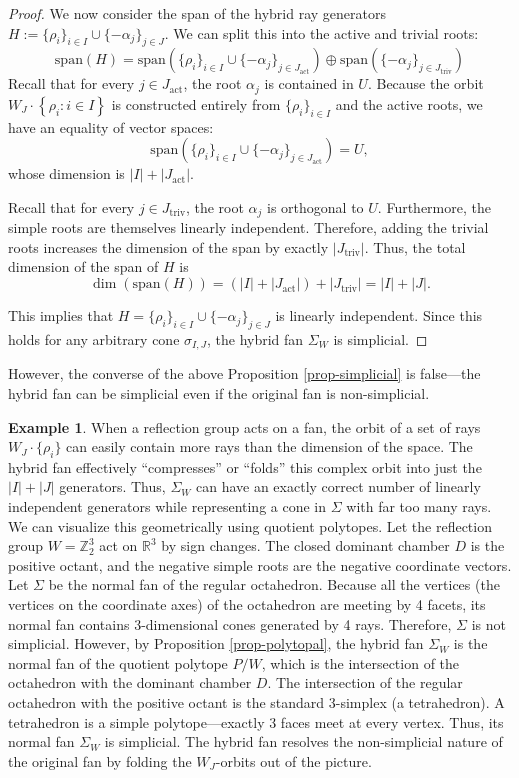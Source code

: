 \documentclass{amsart}
\theoremstyle{definition}
\newtheorem{example}[theorem]{Example}
\theoremstyle{remark}
\numberwithin{equation}{section}
\begin{document}
\begin{proof}
We now consider the span of the hybrid ray generators $H:=\{\rho_i\}_{i\in I} \cup \{-\alpha_j\}_{j \in J}$. 
We can split this into the active and trivial roots:
$$\text{span}(H) = \text{span} \left( \{\rho_i\}_{i\in I} \cup \{-\alpha_j\}_{j \in J_{\text{act}}} \right) \oplus \text{span} \left( \{-\alpha_j\}_{j \in J_{\text{triv}}} \right)$$
Recall that for every $j \in J_{\text{act}}$, the root $\alpha_j$ is contained in $U$. Because the orbit $W_J \cdot \left\{\rho_i: i \in I\right\}$ is constructed entirely from $\{\rho_i\}_{i\in I}$ and the active roots, we have an equality of vector spaces:
$$\text{span} \left( \{\rho_i\}_{i\in I} \cup \{-\alpha_j\}_{j \in J_{\text{act}}} \right) = U,$$
whose dimension is $|I| + |J_{\text{act}}|$.

Recall that for every $j \in J_{\text{triv}}$, the root $\alpha_j$ is orthogonal to $U$. Furthermore, the simple roots are themselves linearly independent. Therefore, adding the trivial roots increases the dimension of the span by exactly $|J_{\text{triv}}|$. Thus, the total dimension of the span of $H$ is
$$\dim(\text{span}(H)) = (|I| + |J_{\text{act}}|) + |J_{\text{triv}}| = |I| + |J|.$$

This implies that $H=\{\rho_i\}_{i\in I} \cup \{-\alpha_j\}_{j \in J}$ is linearly independent. Since this holds for any arbitrary cone $\sigma_{I, J}$, the hybrid fan $\Sigma_W$ is simplicial. 
\end{proof}

However, the converse of the above Proposition \ref{prop-simplicial} is false---the hybrid fan can be simplicial even if the original fan is non-simplicial.

\begin{example}
When a reflection group acts on a fan, the orbit of a set of rays $W_J \cdot \{\rho_i\}$ can easily contain more rays than the dimension of the space. The hybrid fan effectively ``compresses'' or ``folds'' this complex orbit into just the $|I| + |J|$ generators. Thus, $\Sigma_W$ can have an exactly correct number of linearly independent generators while representing a cone in $\Sigma$ with far too many rays. We can visualize this geometrically using quotient polytopes. Let the reflection group $W = \mathbb{Z}_2^3$ act on $\mathbb{R}^3$ by sign changes. The closed dominant chamber $D$ is the positive octant, and the negative simple roots are the negative coordinate vectors. Let $\Sigma$ be the normal fan of the regular octahedron.
Because all the vertices (the vertices on the coordinate axes) of the octahedron are meeting by 4 facets, its normal fan contains 3-dimensional cones generated by 4 rays. Therefore, $\Sigma$ is not simplicial. However, by Proposition \ref{prop-polytopal}, the hybrid fan $\Sigma_W$ is the normal fan of the quotient polytope $P/W$, which is the intersection of the octahedron with the dominant chamber $D$. The intersection of the regular octahedron with the positive octant is the standard 3-simplex (a tetrahedron). A tetrahedron is a simple polytope—exactly 3 faces meet at every vertex. Thus, its normal fan $\Sigma_W$ is simplicial. The hybrid fan resolves the non-simplicial nature of the original fan by folding the $W_J$-orbits out of the picture.
\end{example}
\end{document}
